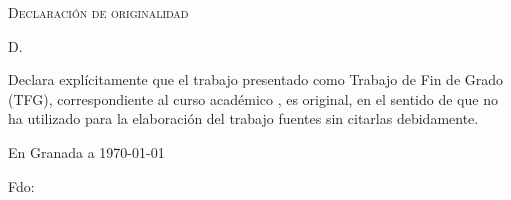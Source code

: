 %

\thispagestyle{empty}

\hfill\vfill

\textsc{Declaración de originalidad}\\\bigskip

D. \miNombre \\\medskip

Declara explícitamente que el trabajo presentado como Trabajo de Fin de Grado (TFG), correspondiente al curso académico \miCurso, es original, en el sentido de que no ha utilizado para la elaboración del trabajo fuentes sin citarlas debidamente.
\medskip

En Granada a \today 
\begin{flushleft} 
Fdo: \miNombre 

\end{flushleft}

\vfill

\cleardoublepage
\endinput
